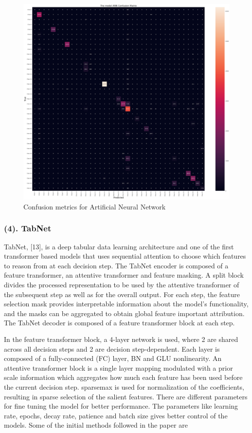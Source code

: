 \documentclass[11 pt,conference,final,]{IEEEtran}
\begin{document}
\begin{figure}

{\centering \includegraphics[width=0.9\linewidth]{img/ANN} 

}

\caption{Confusion metrics for Artificial Neural Network}\label{fig:unnamed-chunk-14}
\end{figure}

\subsubsection{(4). TabNet}\label{tabnet}

TabNet, {[}13{]}, is a deep tabular data learning architecture and one
of the first transformer based models that uses sequential attention to
choose which features to reason from at each decision step. The TabNet
encoder is composed of a feature transformer, an attentive transformer
and feature masking. A split block divides the processed representation
to be used by the attentive transformer of the subsequent step as well
as for the overall output. For each step, the feature selection mask
provides interpretable information about the model's functionality, and
the masks can be aggregated to obtain global feature important
attribution. The TabNet decoder is composed of a feature transformer
block at each step.

In the feature transformer block, a 4-layer network is used, where 2 are
shared across all decision steps and 2 are decision step-dependent. Each
layer is composed of a fully-connected (FC) layer, BN and GLU
nonlinearity. An attentive transformer block is a single layer mapping
modulated with a prior scale information which aggregates how much each
feature has been used before the current decision step. sparsemax is
used for normalization of the coefficients, resulting in sparse
selection of the salient features. There are different parameters for
fine tuning the model for better performance. The parameters like
learning rate, epochs, decay rate, patience and batch size gives better
control of the models. Some of the initial methods followed in the paper
are
\end{document}
